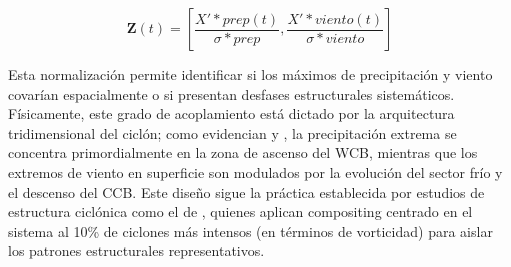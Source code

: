 \begin{equation}
\mathbf{Z}(t) = \left[ \frac{X'*{prep}(t)}{\sigma*{prep}}, \frac{X'*{viento}(t)}{\sigma*{viento}} \right]
\end{equation}

Esta normalización permite identificar si los máximos de precipitación y viento covarían espacialmente o si presentan desfases estructurales sistemáticos. Físicamente, este grado de acoplamiento está dictado por la arquitectura tridimensional del ciclón; como evidencian \citet{catto2015front} y \citet{schemm2014ccb}, la precipitación extrema se concentra primordialmente en la zona de ascenso del WCB, mientras que los extremos de viento en superficie son modulados por la evolución del sector frío y el descenso del CCB. 
Este diseño sigue la práctica establecida por estudios de estructura ciclónica como el de \citet{priestley2022improved}, quienes aplican compositing centrado en el sistema al 10\% de ciclones más intensos (en términos de vorticidad) para aislar los patrones estructurales representativos.
